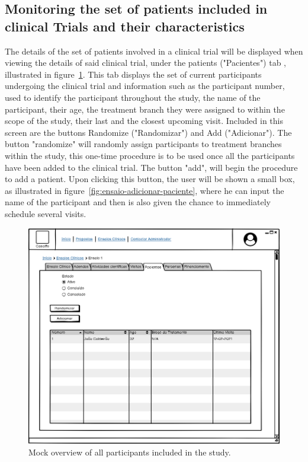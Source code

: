 \subsection{Monitoring the set of patients included in clinical Trials and their characteristics}
\label{subsec:monitor-set-of-patients}
The details of the set of patients involved in a clinical trial will be displayed when viewing the details of said clinical trial, under the patients ("Pacientes") tab , illustrated in figure~\ref{fig:ensaio-participantes}. This tab displays the set of current participants undergoing the clinical trial and information such as the participant number, used to identify the participant throughout the study, the name of the participant, their age, the treatment branch they were assigned to within the scope of the study, their last and the closest upcoming visit.  
Included in this screen are the buttons Randomize ("Randomizar") and Add ("Adicionar").
The button "randomize" will randomly assign participants to treatment branches within the study, this one-time procedure is to be used once all the participants have been added to the clinical trial.
The button "add", will begin the procedure to add a patient. Upon clicking this button, the user will be shown a small box, as illustrated in figure~\ref{fig:ensaio-adicionar-paciente}, where he can input the name of the participant and then is also given the chance to immediately schedule several visits.

\begin{figure}[H]
    \centering
    \includegraphics[scale=0.35]{images/ensaio-participantes.png}
    \caption{Mock overview of all participants included in the study.}
    \label{fig:ensaio-participantes}
\end{figure}

